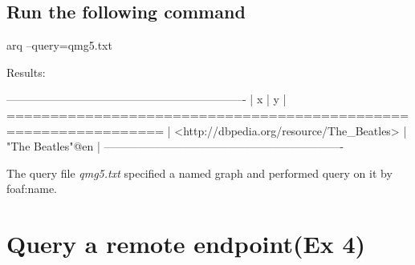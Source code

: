 \documentclass[a4paper, 12pt]{report}
\begin{document}
\section{Run the following command}
\begin{commandshell}
arq --query=qmg5.txt
\end{commandshell}
Results:
\begin{messageshell}
----------------------------------------------------------------
| x                                         | y                |
================================================================
| <http://dbpedia.org/resource/The_Beatles> | "The Beatles"@en |
----------------------------------------------------------------
\end{messageshell}
The query file \emph{qmg5.txt} specified a named graph and performed query on it by foaf:name.


\chapter{Query a remote endpoint(Ex 4)}
\end{document}
